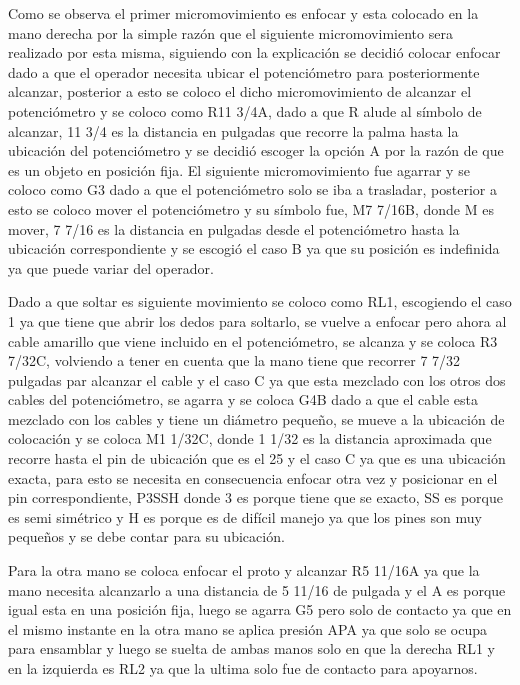     Como se observa el primer micromovimiento es enfocar y esta colocado en la mano derecha por la simple razón que el siguiente micromovimiento sera realizado por esta misma, siguiendo con la explicación se decidió colocar enfocar dado a que el operador necesita ubicar el potenciómetro para posteriormente alcanzar, posterior a esto se coloco el dicho micromovimiento de alcanzar el potenciómetro y se coloco como R11 3/4A, dado a que R alude al símbolo de alcanzar, 11 3/4 es la distancia en pulgadas que recorre la palma hasta la ubicación del potenciómetro y se decidió escoger la opción A por la razón de que es un objeto en posición fija. El siguiente micromovimiento fue agarrar y se coloco como G3 dado a que el potenciómetro solo se iba a trasladar, posterior a esto se coloco mover el potenciómetro y su símbolo fue, M7 7/16B, donde M es mover, 7 7/16 es la distancia en pulgadas desde el potenciómetro hasta la ubicación correspondiente y se escogió el caso B ya que su posición es indefinida ya que puede variar del operador.
    
    Dado a que soltar es siguiente movimiento se coloco como RL1, escogiendo el caso 1 ya que tiene que abrir los dedos para soltarlo, se vuelve a enfocar pero ahora al cable amarillo que viene incluido en el potenciómetro, se alcanza y se coloca R3 7/32C, volviendo a tener en cuenta que la mano tiene que recorrer 7 7/32 pulgadas par alcanzar el cable y el caso C ya que esta mezclado con los otros dos cables del potenciómetro, se agarra y se coloca G4B dado a que el cable esta mezclado con los cables y tiene un diámetro pequeño, se mueve a la ubicación de colocación y se coloca M1 1/32C, donde 1 1/32 es la distancia aproximada que recorre hasta el pin de ubicación que es el 25 y el caso C ya que es una ubicación exacta, para esto se necesita en consecuencia enfocar otra vez y posicionar en el pin correspondiente, P3SSH  donde 3 es porque tiene que se exacto, SS es porque es semi simétrico y H es porque es de difícil manejo ya que los pines son muy pequeños y se debe contar para su ubicación.
    
    Para la otra mano se coloca enfocar el proto y alcanzar R5 11/16A ya que la mano necesita alcanzarlo a una distancia de 5 11/16 de pulgada y el A es porque igual esta en una posición fija, luego se agarra G5 pero solo de contacto ya que en el mismo instante en la otra mano se aplica presión APA ya que solo se ocupa para ensamblar y luego se suelta de ambas manos solo en que la derecha RL1 y en la izquierda es RL2 ya que la ultima solo fue de contacto para apoyarnos.
    
